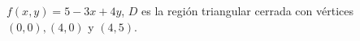 \item $f(x, y) = 5 - 3x + 4y$, $D$ es la región triangular cerrada con vértices $(0, 0), (4, 0)$ y $(4, 5)$.

